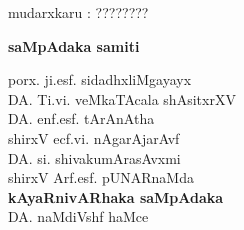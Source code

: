 \medskip

\noindent
mudarxkaru : ????????

\newpage

\thispagestyle{empty}

\phantom{a}

\vfill

\begin{center}
{\Large\bf saMpAdaka samiti}

\bigskip
\medskip

{\fontsize{14pt}{16pt}\selectfont
porx. ji.esf. sidadhxliMgayayx\\[8pt]
DA. Ti.vi. veMkaTAcala shAsitxrXV\\[8pt]
DA. enf.esf. tArAnAtha\\[8pt]
shirxV ecf.vi. nAgarAjarAvf\\[8pt]
DA. si. shivakumArasAvxmi\\[8pt]
shirxV Arf.esf. pUNARnaMda\\[15pt]
{\bf kAyaRnivARhaka saMpAdaka}\\[8pt]
DA. naMdiVshf haMce }\relax
\end{center}

\vfill

\phantom{a}







